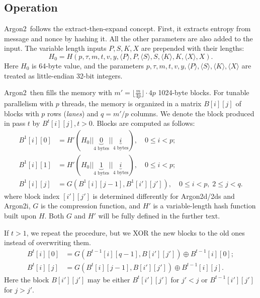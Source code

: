 \documentclass[a4paper]{article}
\begin{document}
\subsection{Operation}

\textsf{Argon2}\ follows the extract-then-expand concept. First, it extracts entropy from message and nonce by hashing it.  All the other parameters are also added to the input. The variable length inputs $P,S,K,X$  are prepended with their lengths:
$$
H_0 = H(p,\tau,m,t,v,y,\langle P \rangle,P,\langle S \rangle,S,\langle K \rangle,K, \langle X \rangle,X).
$$
Here $H_0$ is 64-byte value, and the parameters $p,\tau,m,t,v,y,
\langle P \rangle,\langle S \rangle, \langle K \rangle,\langle X \rangle$ are treated as little-endian 32-bit integers.

\textsf{Argon2}\ then fills the memory with $m' = \lfloor \frac{m}{4p} \rfloor\cdot 4p$ 1024-byte blocks. For tunable parallelism with $p$ threads, the memory is organized in a matrix $B[i][j]$ of blocks
with $p$ rows (\emph{lanes}) and $q=m'/p$ columns. We denote the block produced in pass $t$ by $B^t[i][j],t>0$. Blocks are computed as follows:
\begin{align*}
B^1[i][0] &= H'(H_0||\underbrace{0}_{\text{4 bytes}}||\underbrace{i}_{\text{4 bytes}}),\quad 0 \leq i < p; \\
B^1[i][1] &= H'(H_0||\underbrace{1}_{\text{4 bytes}}||\underbrace{i}_{\text{4 bytes}}),\quad 0 \leq i < p;\\
B^1[i][j] &= G(B^1[i][j-1], B^1[i'][j']),\quad 0 \leq i < p,\; 2\leq j <q.
\end{align*}
where block index $[i'][j']$ is determined differently for \textsf{Argon2d/2ds} and \textsf{Argon2i},  $G$ is the compression function, and $H'$ is a variable-length hash function built upon $H$. Both $G$ and $H'$ will be fully defined in the further text. 

If $t>1$, we repeat the procedure, but we XOR the new blocks to the old ones instead of overwriting them. 
\begin{align*}
B^t[i][0] &=G(B^{t-1}[i][q-1], B[i'][j']) \oplus B^{t-1}[i][0];\\
B^t[i][j] &= G(B^{t}[i][j-1], B[i'][j'])\oplus B^{t-1}[i][j].
\end{align*}
Here the block $B[i'][j']$ may be either $B^t[i'][j']$ for $j'<j$ or $B^{t-1}[i'][j']$ for $j>j'$.
\end{document}
